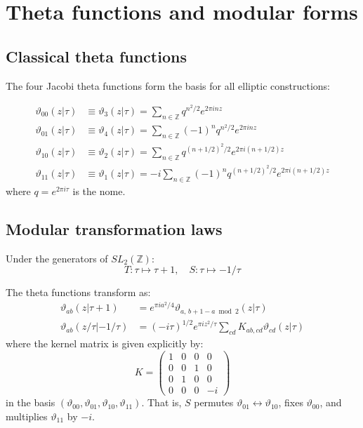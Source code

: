 
\section{Theta functions and modular forms}
\label{app:theta}

\subsection{Classical theta functions}

The four Jacobi theta functions form the basis for all elliptic constructions:

\begin{definition}
\begin{align}
\vartheta_{00}(z|\tau) &\equiv \vartheta_3(z|\tau) = \sum_{n \in \mathbb{Z}} q^{n^2/2} e^{2\pi inz} \\
\vartheta_{01}(z|\tau) &\equiv \vartheta_4(z|\tau) = \sum_{n \in \mathbb{Z}}(-1)^n q^{n^2/2} e^{2\pi inz} \\
\vartheta_{10}(z|\tau) &\equiv \vartheta_2(z|\tau) = \sum_{n \in \mathbb{Z}} q^{(n+1/2)^2/2} e^{2\pi i(n+1/2)z} \\
\vartheta_{11}(z|\tau) &\equiv \vartheta_1(z|\tau) = -i\sum_{n \in \mathbb{Z}}(-1)^n q^{(n+1/2)^2/2} e^{2\pi i(n+1/2)z}
\end{align}
where $q = e^{2\pi i\tau}$ is the nome.
\end{definition}

\subsection{Modular transformation laws}

Under the generators of $SL_2(\mathbb{Z})$:
\[T: \tau \mapsto \tau + 1, \quad S: \tau \mapsto -1/\tau\]

The theta functions transform as:
\begin{align}
\vartheta_{ab}(z|\tau+1) &= e^{\pi ia^2/4} \vartheta_{a,\, b+1-a \bmod 2}(z|\tau) \\
\vartheta_{ab}(z/\tau|-1/\tau) &= (-i\tau)^{1/2} e^{\pi iz^2/\tau} \sum_{cd} K_{ab,cd} \vartheta_{cd}(z|\tau)
\end{align}
where the kernel matrix is given explicitly by:
\[K = \begin{pmatrix} 1 & 0 & 0 & 0 \\ 0 & 0 & 1 & 0 \\ 0 & 1 & 0 & 0 \\ 0 & 0 & 0 & -i \end{pmatrix}\]
in the basis $(\vartheta_{00}, \vartheta_{01}, \vartheta_{10}, \vartheta_{11})$.  That is, $S$ permutes $\vartheta_{01} \leftrightarrow \vartheta_{10}$, fixes $\vartheta_{00}$, and multiplies $\vartheta_{11}$ by $-i$.

